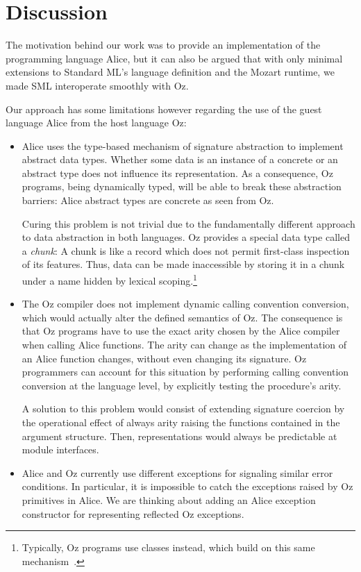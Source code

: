 \documentclass{entcs}
\begin{document}
\section{Discussion}\label{discussion}

The motivation behind our work was to provide an implementation of the
programming language Alice, but it can also be argued that with only
minimal extensions to Standard ML's language definition and the Mozart
runtime, we made SML interoperate smoothly with Oz.

Our approach has some limitations however regarding the use of the guest
language Alice from the host language Oz:
\begin{itemize}
\item Alice uses the type-based mechanism of signature abstraction to
  implement abstract data types.  Whether some data is an instance of
  a concrete or an abstract type does not influence its representation.
  As a consequence, Oz programs, being dynamically typed, will be able
  to break these abstraction barriers:  Alice abstract types are concrete
  as seen from Oz.

  Curing this problem is not trivial due to the fundamentally different
  approach to data abstraction in both languages.  Oz provides a special
  data type called a {\itshape chunk}:  A chunk is like a record which does
  not permit first-class inspection of its features.  Thus, data can be
  made inaccessible by storing it in a chunk under a name hidden by
  lexical scoping.\footnote{Typically, Oz programs use classes instead,
  which build on this same mechanism~\cite{ObjectsInOz}.}
\item The Oz compiler does not implement dynamic calling convention
  conversion, which would actually alter the defined semantics of Oz.
  The consequence is that Oz programs have to use the exact arity chosen
  by the Alice compiler when calling Alice functions.  The arity can
  change as the implementation of an Alice function changes, without
  even changing its signature.  Oz programmers can account for this
  situation by performing calling convention conversion at the language
  level, by explicitly testing the procedure's arity.

  A solution to this problem would consist of extending signature coercion
  by the operational effect of always arity raising the functions contained
  in the argument structure.  Then, representations would always be
  predictable at module interfaces.
\item Alice and Oz currently use different exceptions for signaling
  similar error conditions.  In particular, it is impossible to catch
  the exceptions raised by Oz primitives in Alice.  We are thinking about
  adding an Alice exception constructor for representing reflected Oz
  exceptions.
\end{itemize}
\end{document}

